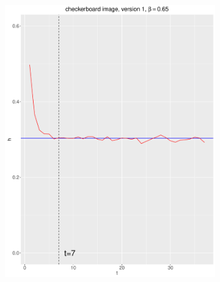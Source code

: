 \documentclass[12pt, oneside]{article}   	%
\begin{document}
\begin{figure}[H]
\begin{subfigure}[b]{0.475\textwidth}
            \includegraphics[width=\textwidth, height=0.32\textheight]{check_v1_65.pdf}
        \end{subfigure} \\
        \centering
        \begin{subfigure}[b]{0.475\textwidth}
            \centering

\end{subfigure}
\end{figure}
\end{document}
